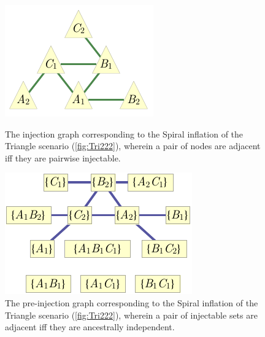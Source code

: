 \documentclass[aps,english,superscriptaddress,onecolumn,twoside,longbibliography,pra,floatfix,fleqn,nofootinbib]{revtex4-1}%
\theoremstyle{definition}
\begin{document}
\begin{figure}[t]
\centering
\begin{minipage}[t]{0.3\linewidth}
\centering
\includegraphics[scale=1]{injectiongraph222.pdf}
\caption{The injection graph corresponding to the Spiral inflation of the Triangle scenario (\cref{fig:Tri222}), wherein a pair of nodes are adjacent iff they are pairwise injectable.}\label{fig:injection222}
\end{minipage}
\hfill
\begin{minipage}[t]{0.3\linewidth}
\centering
\includegraphics[scale=1]{preinjectiongraph222.pdf}
\caption{The pre-injection graph corresponding to the  Spiral inflation of the Triangle scenario (\cref{fig:Tri222}), wherein a pair of injectable sets are adjacent iff they are ancestrally independent. }\label{fig:preinjectiongraph222}
\end{minipage}
\hfill
\begin{minipage}[t]{0.3\linewidth}
\centering

\end{minipage}
\end{figure}
\end{document}
